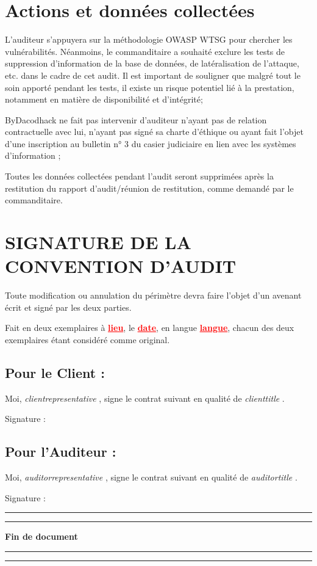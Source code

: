\documentclass[12pt]{extarticle}
\begin{document}
\section{Actions et données collectées}
    L’auditeur s’appuyera sur la méthodologie OWASP WTSG pour chercher les vulnérabilités. Néanmoins, le commanditaire a souhaité exclure les tests de suppression d’information de la base de données, de latéralisation de l’attaque, etc. dans le cadre de cet audit. Il est important de souligner que malgré tout le soin apporté pendant les tests, il existe un risque potentiel lié à la prestation, notamment en matière de disponibilité et d’intégrité;

    ByDacodhack ne fait pas intervenir d’auditeur n’ayant pas de relation contractuelle avec lui, n'ayant pas signé sa charte d’éthique ou ayant fait l’objet d’une inscription au bulletin n° 3 du casier judiciaire en lien avec les systèmes d’information ;

    Toutes les données collectées pendant l’audit seront supprimées après la restitution du rapport d’audit/réunion de restitution, comme demandé par le commanditaire.

\newpage

\section{SIGNATURE DE LA CONVENTION D'AUDIT}

    Toute modification ou annulation du périmètre devra faire l'objet d'un avenant écrit et signé par les deux parties.
    
    Fait en deux exemplaires à \textcolor{red}{\textbf{\underline{lieu}}}, le \textcolor{red}{\textbf{\underline{date}}}, en langue \textcolor{red}{\textbf{\underline{langue}}}, chacun des deux exemplaires étant considéré comme original.

    \subsection{Pour le Client :} 
    Moi, \textit{ {{clientrepresentative}} }, signe le contrat suivant en qualité de \textit{ {{clienttitle}} }.
    \vspace{3cm}

    Signature :
    \subsection{Pour l'Auditeur :} 
    Moi, \textit{ {{auditorrepresentative}} }, signe le contrat suivant en qualité de \textit{ {{auditortitle}} }.
    \vspace{3cm}

    Signature :
    \noindent\rule{\textwidth}{0.4pt}  
    \vspace{1cm}  
    \noindent\rule{\textwidth}{0.4pt}  
    \begin{center}
        \Huge\textbf{Fin de document}
    \end{center}
    \vspace{1cm}  
    \noindent\rule{\textwidth}{0.4pt}  
    \vspace{1cm}  
    \noindent\rule{\textwidth}{0.4pt}  
\end{document}
